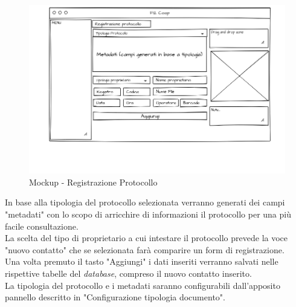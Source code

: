 \begin{figure}[!h] 
    \centering 
    \includegraphics[width=1\columnwidth]{immagini/mockup/Registrazioneprotocollo.png} 
    \caption{Mockup - Registrazione Protocollo}
\end{figure}
\newpage

In base alla tipologia del protocollo selezionata verranno generati dei campi "metadati" con lo scopo di arricchire di informazioni il protocollo per una più facile consultazione.
\\ 
La scelta del tipo di proprietario a cui intestare il protocollo prevede la voce "nuovo contatto" che se selezionata farà comparire un form di registrazione.
\\
Una volta premuto il tasto "Aggiungi" i dati inseriti verranno salvati nelle rispettive tabelle del \textit{database}, compreso il nuovo contatto inserito.
\\
La tipologia del protocollo e i metadati saranno configurabili dall'apposito pannello descritto in "Configurazione tipologia documento".

